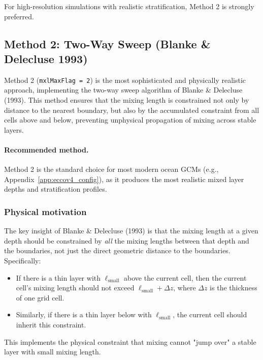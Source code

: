 \documentclass[12pt,letterpaper]{article}
\begin{document}
For high-resolution simulations with realistic stratification, Method 2 is strongly preferred.

\subsection{Method 2: Two-Way Sweep (Blanke \& Delecluse 1993)}
\label{sec:mxl_method2}

Method 2 (\verb|mxlMaxFlag = 2|) is the most sophisticated and physically realistic approach, implementing the two-way sweep algorithm of Blanke \& Delecluse (1993). This method ensures that the mixing length is constrained not only by distance to the nearest boundary, but also by the accumulated constraint from all cells above and below, preventing unphysical propagation of mixing across stable layers.

\paragraph{Recommended method.} Method 2 is the standard choice for most modern ocean GCMs (e.g., Appendix~\ref{app:eccov4_config}), as it produces the most realistic mixed layer depths and stratification profiles.

\subsubsection{Physical motivation}

The key insight of Blanke \& Delecluse (1993) is that the mixing length at a given depth should be constrained by \emph{all} the mixing lengths between that depth and the boundaries, not just the direct geometric distance to the boundaries. Specifically:

\begin{itemize}
\item If there is a thin layer with $\ell_{\text{small}}$ above the current cell, then the current cell's mixing length should not exceed $\ell_{\text{small}} + \Delta z$, where $\Delta z$ is the thickness of one grid cell.
\item Similarly, if there is a thin layer below with $\ell_{\text{small}}$, the current cell should inherit this constraint.
\end{itemize}

This implements the physical constraint that mixing cannot "jump over" a stable layer with small mixing length.
\end{document}
